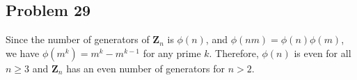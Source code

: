 \subsection*{Problem 29}
\noindent Since the number of generators of $\mathbf{Z}_n$ is $\phi(n)$, and $\phi(nm) = \phi(n) \phi(m)$, we have $\phi(m^k) = m^k - m^{k - 1}$ for any prime $k$. Therefore, $\phi(n)$ is even for all $n \geq 3$ and $\mathbf{Z}_n$ has an even number of generators for $n > 2$. 


